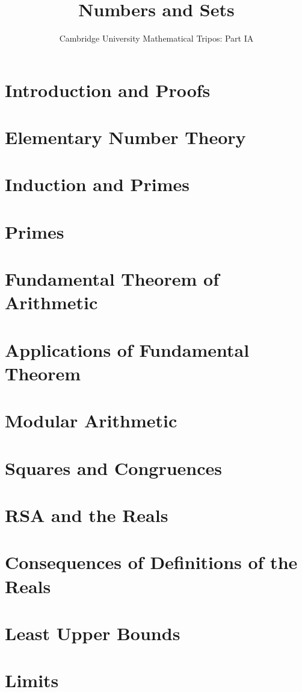 \documentclass{article}
\title{Numbers and Sets}
\author{Cambridge University Mathematical Tripos: Part IA}
\begin{document}
\maketitle

\tableofcontentsnewpage{}

\section{Introduction and Proofs}

\section{Elementary Number Theory}

\section{Induction and Primes}

\section{Primes}

\section{Fundamental Theorem of Arithmetic}

\section{Applications of Fundamental Theorem}

\section{Modular Arithmetic}

\section{Squares and Congruences}

\section{RSA and the Reals}

\section{Consequences of Definitions of the Reals}

\section{Least Upper Bounds}

\section{Limits}

\end{document}
